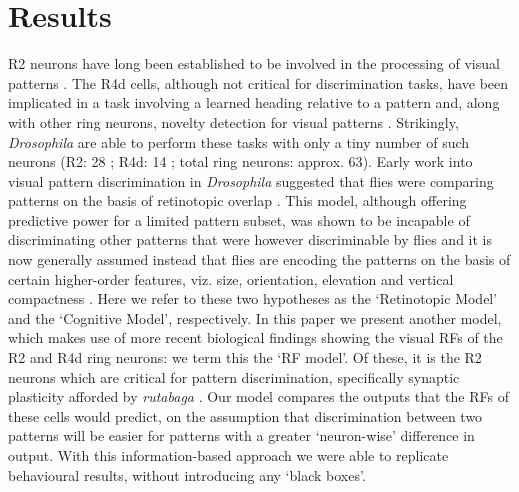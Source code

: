 \section{Results}
R2 neurons have long been established to be involved in the processing of visual patterns \cite{Pan2009,Liu2006,Ernst1999}.
The R4d cells, although not critical for discrimination tasks, have been implicated in a task involving a learned heading relative to a pattern \cite{Guo2015} and, along with other ring neurons, novelty detection for visual patterns \cite{Solanki2015}.
Strikingly, \emph{Drosophila} are able to perform these tasks with only a tiny number of such neurons (R2: 28 \cite{Seelig2013}; R4d: 14 \cite{Seelig2013}; total ring neurons: approx. 63\cite{MartinPena2014}).
Early work into visual pattern discrimination in \emph{Drosophila} suggested that flies were comparing patterns on the basis of retinotopic overlap \cite{Dill1995,Dill1993}.
This model, although offering predictive power for a limited pattern subset, was shown to be incapable of discriminating other patterns that were however discriminable by flies \cite{Ernst1999} and it is now generally assumed instead that flies are encoding the patterns on the basis of certain higher-order features, viz. size, orientation, elevation and vertical compactness \cite{Ernst1999,Liu2006,Pan2009}.
Here we refer to these two hypotheses as the `Retinotopic Model' and the `Cognitive Model', respectively.
In this paper we present another model, which makes use of more recent biological findings \cite{Seelig2013} showing the visual RFs of the R2 and R4d ring neurons: we term this the `RF model'.
Of these, it is the R2 neurons which are critical for pattern discrimination, specifically synaptic plasticity afforded by \emph{rutabaga} \cite{Pan2009,Wang2008,Liu2006,Ernst1999}.
Our model compares the outputs that the RFs of these cells would predict, on the assumption that discrimination between two patterns will be easier for patterns with a greater `neuron-wise' difference in output.
With this information-based approach we were able to replicate behavioural results, without introducing any `black boxes'.

